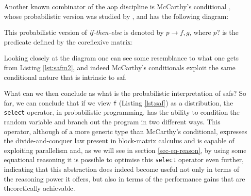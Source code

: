 \documentclass[
  oneside,
  11pt, a4paper,
  footinclude=true,
  headinclude=true,
  cleardoublepage=empty
]{scrbook}
\theoremstyle{definition}
\theoremstyle{definition}
\begin{document}
        Another known combinator of the \gls{aop} discipline is McCarthy's conditional \citep{Bird:1997:AP:248932}, whose probabilistic version was studied by \cite{oliveira2012towards}, and has the following diagram:
        
        \begin{center}\label{dig-mccarthy}
        \end{center}{}
        
        This probabilistic version of \emph{if-then-else} is denoted by $p \rightarrow f,g$, where $p?$ is the predicate defined by the coreflexive matrix:
        
        \begin{center}
        \end{center}{}
        
        Looking closely at the diagram one can see some resemblance to what one gets from Listing \ref{lst:safm2}, and indeed McCarthy's conditionals exploit the same conditional nature that is intrinsic to \gls{saf}.
        
        What can we then conclude as what is the probabilistic interpretation of \glspl{saf}? So far, we can conclude that if we view \texttt{f} (Listing \ref{lst:saf}) as a distribution, the \texttt{select} operator, in probabilistic programming, has the ability to condition the random variable and branch out the program in two different ways. This operator, although of a more generic type than McCarthy's conditional, expresses the divide-and-conquer law present in block-matrix calculus and is capable of exploiting parallelism and, as we will see in section \ref{sec-eq-reason}, by using some equational reasoning it is possible to optimise this \texttt{select} operator even further, indicating that this abstraction does indeed become useful not only in terms of the reasoning power it offers, but also in terms of the performance gains that are theoretically achievable.
        
\end{document}
